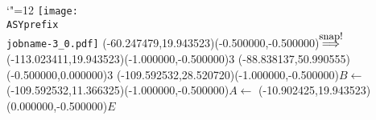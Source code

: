 \setlength{\unitlength}{1pt}
\makeatletter%
\let\ASYencoding\f@encoding%
\let\ASYfamily\f@family%
\let\ASYseries\f@series%
\let\ASYshape\f@shape%
\makeatother%
{\catcode`"=12%
\texttt{[image: \\ASYprefix\\jobname-3\_0.pdf]}%
}%
\color{ASYcolor}
\fontsize{12.000000}{14.400000}\selectfont
\usefont{\ASYencoding}{\ASYfamily}{\ASYseries}{\ASYshape}%
\ASYalign(-60.247479,19.943523)(-0.500000,-0.500000){$\stackrel{\mbox{\small snap!}}{\Longrightarrow}$}%
\color{ASYcolor}
\fontsize{12.000000}{14.400000}\selectfont
\ASYalign(-113.023411,19.943523)(-1.000000,-0.500000){$3$}%
\color{ASYcolor}
\fontsize{12.000000}{14.400000}\selectfont
\ASYalign(-88.838137,50.990555)(-0.500000,0.000000){$3$}%
\color{ASYcolor}
\fontsize{12.000000}{14.400000}\selectfont
\ASYalign(-109.592532,28.520720)(-1.000000,-0.500000){$B \leftarrow$}%
\color{ASYcolor}
\fontsize{12.000000}{14.400000}\selectfont
\ASYalign(-109.592532,11.366325)(-1.000000,-0.500000){$A \leftarrow$}%
\color{ASYcolor}
\fontsize{12.000000}{14.400000}\selectfont
\ASYalign(-10.902425,19.943523)(0.000000,-0.500000){$E$}%
